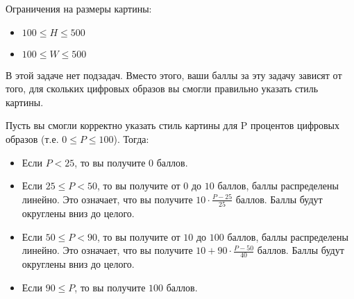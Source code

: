 Ограничения на размеры картины:
\begin{itemize}
\item $100 \leq H \leq 500$
\item $100 \leq W \leq 500$
\end{itemize}
В этой задаче нет подзадач. Вместо этого, ваши баллы за эту задачу зависят от того, для скольких цифровых образов вы смогли правильно указать стиль картины.

Пусть вы смогли корректно указать стиль картины для P процентов цифровых образов (т.е. $0 \leq P \leq 100$). Тогда:
\begin{itemize}
\item Если $P < 25$, то вы получите $0$ баллов.
\item Если $25 \leq P < 50$, то вы получите от $0$ до $10$ баллов, баллы распределены линейно. Это означает, что вы получите $10 \cdot \frac{P -­ 25}{25}$ баллов. Баллы будут округлены вниз до целого.
\item Если $50 \leq P < 90$, то вы получите от $10$ до $100$ баллов, баллы распределены линейно. Это означает, что вы получите $10 + 90 \cdot \frac{P ­- 50}{40}$ баллов. Баллы будут округлены вниз до целого.
\item Если $90 \leq P$, то вы получите $100$ баллов.
\end{itemize}
